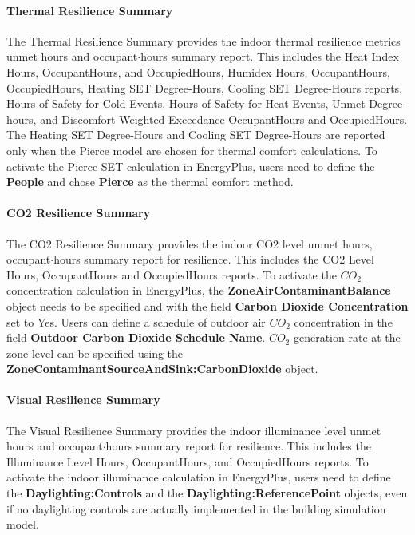 \paragraph{Thermal Resilience Summary}\label{ThermalResilienceSummary}

The Thermal Resilience Summary provides the indoor thermal resilience metrics
unmet hours and occupant$·$hours summary report. This includes the Heat Index
Hours, OccupantHours, and OccupiedHours, Humidex Hours, OccupantHours,
OccupiedHours, Heating SET Degree-Hours, Cooling SET Degree-Hours reports, Hours
of Safety for Cold Events, Hours of Safety for Heat Events, Unmet Degree-hours,
and Discomfort-Weighted Exceedance OccupantHours and OccupiedHours. The Heating
SET Degree-Hours and Cooling SET Degree-Hours are reported only when the Pierce
model are chosen for thermal comfort calculations. To activate the Pierce SET
calculation in EnergyPlus, users need to define the \textbf{People} and chose
\textbf{Pierce} as the thermal comfort method.

\paragraph{CO2 Resilience Summary}\label{CO2ResilienceSummary}

The CO2 Resilience Summary provides the indoor CO2 level unmet hours,
occupant$·$hours summary report for resilience. This includes the CO2 Level
Hours, OccupantHours and OccupiedHours reports. To activate the $CO_2$
concentration calculation in EnergyPlus, the \textbf{ZoneAirContaminantBalance}
object needs to be specified and with the field \textbf{Carbon Dioxide
  Concentration} set to Yes. Users can define a schedule of outdoor air $CO_2$
concentration in the field \textbf{Outdoor Carbon Dioxide Schedule Name}. $CO_2$
generation rate at the zone level can be specified using the
\textbf{ZoneContaminantSourceAndSink:CarbonDioxide} object.

\paragraph{Visual Resilience Summary}\label{VisualResilienceSummary}

The Visual Resilience Summary provides the indoor illuminance level unmet hours
and occupant$·$hours summary report for resilience. This includes the
Illuminance Level Hours, OccupantHours, and OccupiedHours reports. To activate
the indoor illuminance calculation in EnergyPlus, users need to define the
\textbf{Daylighting:Controls} and the \textbf{Daylighting:ReferencePoint}
objects, even if no daylighting controls are actually implemented in the
building simulation model.


